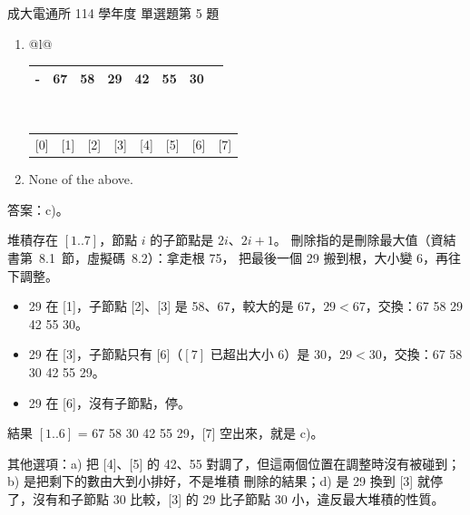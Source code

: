 \begin{pastexam}[label={px:ncku-114-cce-ds-05}]{成大電通所 114 學年度 單選題第 5 題}
\begin{enumerate}[label=\alph*),itemsep=2pt]
\item \begin{tabular}[t]{@{}l@{}}\begin{tabular}{*{8}{|c}|}\hline - & 67 & 58 & 29 & 42 & 55 & 30 &  \\ \hline\end{tabular}\\[-2pt]
{\small\begin{tabular}{*{8}{c}}[0]&[1]&[2]&[3]&[4]&[5]&[6]&[7]\end{tabular}}\end{tabular}
\item None of the above.
\end{enumerate}
\end{pastexam}

\begin{pastsoln}
答案：c)。

堆積存在 $[1..7]$，節點 $i$ 的子節點是 $2i$、$2i+1$。 刪除指的是刪除最大值（資結書第~8.1~節，虛擬碼~8.2）：拿走根 75，
把最後一個 29 搬到根，大小變 6，再往下調整。
\begin{itemize}[nosep]
\item 29 在 [1]，子節點 [2]、[3] 是 58、67，較大的是 67，$29 < 67$，交換：67 58 29 42 55 30。
\item 29 在 [3]，子節點只有 [6]（$[7]$ 已超出大小 6）是 30，$29 < 30$，交換：67 58 30 42 55 29。
\item 29 在 [6]，沒有子節點，停。
\end{itemize}
結果 $[1..6]$ = 67 58 30 42 55 29，[7] 空出來，就是 c)。

其他選項：a) 把 [4]、[5] 的 42、55 對調了，但這兩個位置在調整時沒有被碰到；b) 是把剩下的數由大到小排好，不是堆積
刪除的結果；d) 是 29 換到 [3] 就停了，沒有和子節點 30 比較，[3] 的 29 比子節點 30 小，違反最大堆積的性質。
\end{pastsoln}
